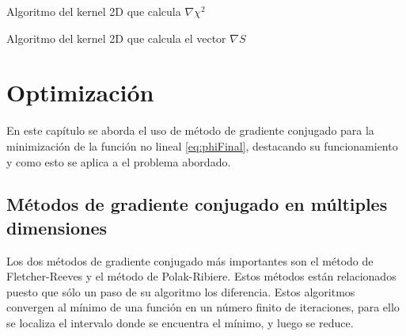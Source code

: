 \begin{algorithm}
	\begin{algorithmic}[1]
		\ENDFOR
	\end{algorithmic}
	\caption{Algoritmo del kernel 2D que calcula $\nabla \chi^{2}$}
	\label{alg:dchi2}
\end{algorithm}

\begin{algorithm}
	\begin{algorithmic}[1]
	\end{algorithmic}
	\caption{Algoritmo del kernel 2D que calcula el vector $\nabla S$}
	\label{alg:S}
\end{algorithm}

\chapter{Optimización}
\label{cap:opti}

En este capítulo se aborda el uso de método de gradiente conjugado para la minimización de la función no lineal \ref{eq:phiFinal}, destacando su funcionamiento y como esto se aplica a el problema abordado.

\section{Métodos de gradiente conjugado en múltiples dimensiones}

Los dos métodos de gradiente conjugado más importantes son el método de Fletcher-Reeves y el método de Polak-Ribiere. Estos métodos están relacionados puesto que sólo un paso de su algoritmo los diferencia. Estos algoritmos convergen al mínimo de una función en un número finito de iteraciones, para ello se localiza el intervalo donde se encuentra el mínimo, y luego se reduce.

